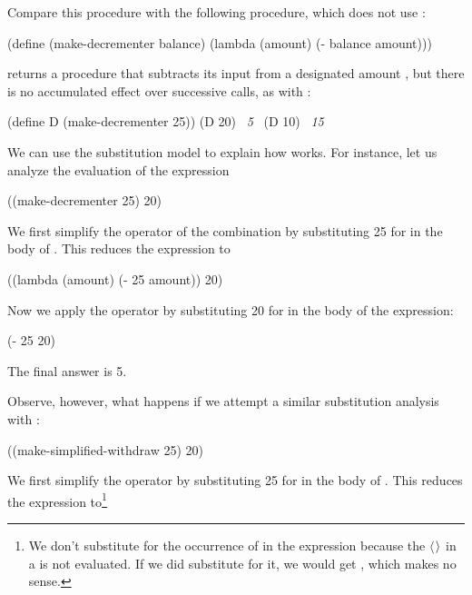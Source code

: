 \noindent
Compare this procedure with the following  procedure,
which does not use :

\begin{codeBlock}
(define (make-decrementer balance)
  (lambda (amount)
    (- balance amount)))
\end{codeBlock}

\noindent
{} returns a procedure that subtracts its input from a
designated amount , but there is no accumulated effect over
successive calls, as with :

\begin{codeBlock}
(define D (make-decrementer 25))
(D 20)
~\textit{5}~
(D 10)
~\textit{15}~
\end{codeBlock}

\noindent
We can use the substitution model to explain how  works.
For instance, let us analyze the evaluation of the expression

\begin{codeBlock}
((make-decrementer 25) 20)
\end{codeBlock}

\noindent
We first simplify the operator of the combination by substituting 25 for
 in the body of .  This reduces the
expression to

\begin{codeBlock}
((lambda (amount) (- 25 amount)) 20)
\end{codeBlock}

\noindent
Now we apply the operator by substituting 20 for  in the body of
the  expression:

\begin{codeBlock}
(- 25 20)
\end{codeBlock}

\noindent
The final answer is 5.

Observe, however, what happens if we attempt a similar substitution analysis
with :

\begin{codeBlock}
((make-simplified-withdraw 25) 20)
\end{codeBlock}

\noindent
We first simplify the operator by substituting 25 for  in the
body of .  This reduces the expression
to\footnote{We don't substitute for the occurrence of  in the
 expression because the \( \langle \)\( \kern0.08em\rangle \) in a  is not
evaluated.  If we did substitute for it, we would get , which makes no sense.}

